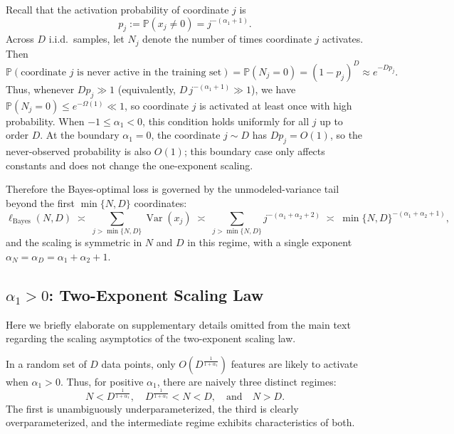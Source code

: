 \documentclass[11pt]{article}
\theoremstyle{plain}
\theoremstyle{definition}
\theoremstyle{remark}
\newcommand{\JSCheck}[1]{#1}
\begin{document}
Recall that the activation probability of coordinate $j$ is
\[
p_j := \mathbb{P}(x_j\neq 0)=j^{-(\alpha_1+1)}.
\]
Across $D$ i.i.d.\ samples, let $N_j$ denote the number of times coordinate $j$ activates. Then
\[
\mathbb{P}(\text{coordinate $j$ is never active in the training set})
=\mathbb{P}(N_j=0)=(1-p_j)^D \approx e^{-Dp_j}.
\]
Thus, whenever $Dp_j\gg 1$ (equivalently, $D\,j^{-(\alpha_1+1)}\gg 1$), we have $\mathbb{P}(N_j=0)\le e^{-\Omega(1)}\ll 1$, so coordinate $j$ is activated at least once with high probability. \JSCheck{When $-1\le \alpha_1<0$, this condition holds uniformly for all $j$ up to order $D$. At the boundary $\alpha_1=0$, the coordinate $j\sim D$ has $Dp_j=O(1)$, so the never-observed probability is also $O(1)$; this boundary case only affects constants and does not change the one-exponent scaling.}



Therefore the Bayes-optimal loss is governed by the unmodeled-variance tail beyond the first $\min\{N,D\}$ coordinates:
\[
\ell_{\mathrm{Bayes}}(N,D)\;\asymp\;\sum_{j>\min\{N,D\}} \operatorname{Var}(x_j)
\;\asymp\;\sum_{j>\min\{N,D\}} j^{-(\alpha_1+\alpha_2+2)}
\;\asymp\;\min\{N,D\}^{-(\alpha_1+\alpha_2+1)},
\]
and the scaling is symmetric in $N$ and $D$ in this regime, with a single exponent $\alpha_N = \alpha_D = \alpha_1+\alpha_2+1$.



\subsection{$\alpha_1>0$: Two-Exponent Scaling Law}\label{appendix:TwoExpon}
Here we briefly elaborate on supplementary details omitted from the main text regarding the scaling asymptotics of the two-exponent scaling law.




In a random set of $D$ data points, only $O(D^{\frac{1}{1+\alpha_1}})$ features are likely to activate when $\alpha_1 > 0$. Thus, for positive $\alpha_1$, there are naively three distinct regimes:
\[
N < D^{\frac{1}{1+\alpha_1}}, \quad D^{\frac{1}{1+\alpha_1}} < N < D, \quad \text{and} \quad N > D.
\]
The first is unambiguously underparameterized, the third is clearly overparameterized, and the intermediate regime exhibits characteristics of both. 
\end{document}
